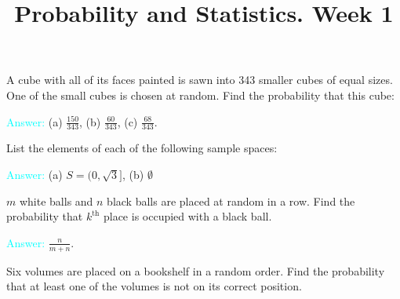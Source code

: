 \documentclass[14pt]{exam}
\title{Probability and Statistics. Week 1}
\date{}
\begin{document}
	\maketitle
	
	
	\begin{questions}
		\question
		A cube with all of its faces painted is sawn into 343 smaller cubes of equal sizes. One of the small cubes is chosen at random. Find the probability that this cube:
		
		
		\textcolor{cyan}{Answer:} (a) $\frac{150}{343}$, (b) $\frac{60}{343}$, (c) $\frac{68}{343}$.
		
		\question
		List the elements of each of the following sample spaces:
		
		
		\textcolor{cyan}{Answer:} (a) $S = (0, \sqrt 3]$, (b) $\emptyset$
		
		\question
		$m$ white balls and $n$ black balls are placed at random in a row. Find the probability that $k^\text{th}$ place is occupied with a black ball.
		
		\textcolor{cyan}{Answer:} $\frac{n}{m+n}$.
		
		\question
		Six volumes are placed on a bookshelf in a random order. Find the probability that at least one of the volumes is not on its correct position.
		

\end{questions}
\end{document}
